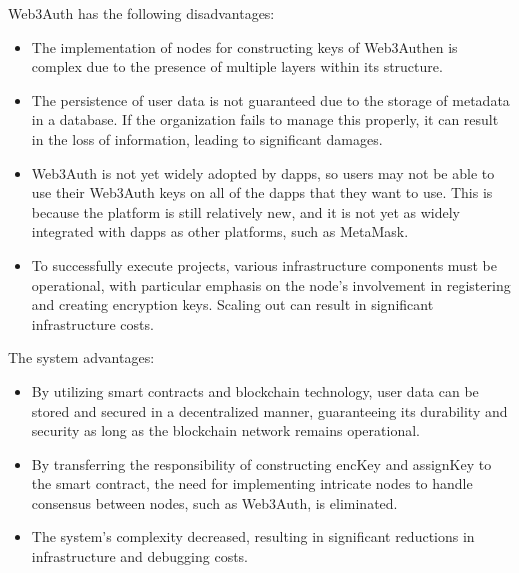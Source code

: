 \documentclass[../Main.tex]{subfiles}
\begin{document}
\indent Web3Auth has the following disadvantages:
\begin{itemize}
  \item The implementation of nodes for constructing keys of Web3Authen is complex due to the presence of multiple layers within its structure.
  \item The persistence of user data is not guaranteed due to the storage of metadata in a database. If the organization fails to manage this properly, it can result in the loss of information, leading to significant damages.
  \item Web3Auth is not yet widely adopted by dapps, so users may not be able to use their Web3Auth keys on all of the dapps that they want to use. This is because the platform is still relatively new, and it is not yet as widely integrated with dapps as other platforms, such as MetaMask.
  \item To successfully execute projects, various infrastructure components must be operational, with particular emphasis on the node's involvement in registering and creating encryption keys. Scaling out can result in significant infrastructure costs.
\end{itemize}
\indent The system advantages:
\begin{itemize}
  \item By utilizing smart contracts and blockchain technology, user data can be stored and secured in a decentralized manner, guaranteeing its durability and security as long as the blockchain network remains operational.
  \item By transferring the responsibility of constructing encKey and assignKey to the smart contract, the need for implementing intricate nodes to handle consensus between nodes, such as Web3Auth, is eliminated.
  \item The system's complexity decreased, resulting in significant reductions in infrastructure and debugging costs.
\end{itemize}
\end{document}
